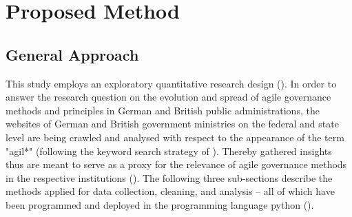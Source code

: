 








\section{Proposed Method}
\subsection{General Approach}
This study employs an exploratory quantitative research design (\cite{Olston2010, Jaeger1998}). In order to answer the research question on the evolution and spread of agile governance methods and principles in German and British public administrations, the websites of German and British government ministries on the federal and state level are being crawled and analysed with respect to the appearance of the term "agil*" (following the keyword search strategy of \cite{Mergel2018}). Thereby gathered insights thus are meant to serve as a proxy for the relevance of agile governance methods in the respective institutions (\cite{Branco2006, Ghosh2013}). The following three sub-sections describe the methods applied for data collection, cleaning, and analysis – all of which have been programmed and deployed in the programming language python (\cite{VanRossum1995}).
%
